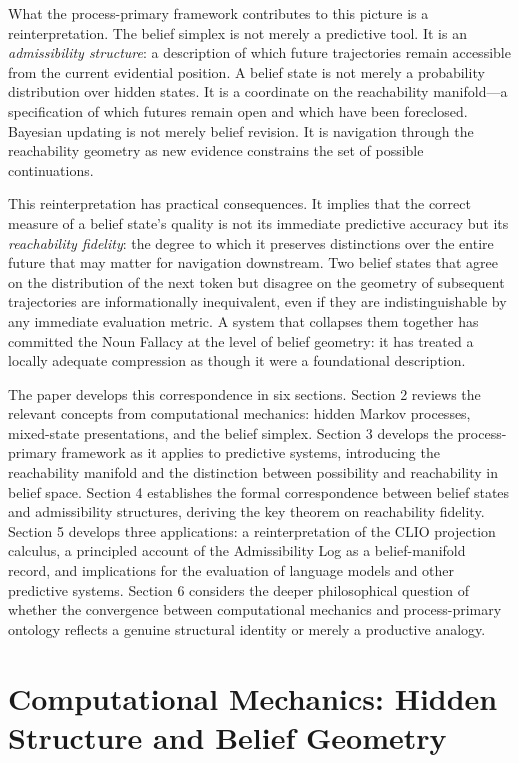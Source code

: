 \documentclass[12pt, a4paper]{article}
\theoremstyle{plain}
\theoremstyle{definition}
\theoremstyle{remark}
\begin{document}
What the process-primary framework contributes to this picture is a
reinterpretation. The belief simplex is not merely a predictive tool. It
is an \emph{admissibility structure}: a description of which future
trajectories remain accessible from the current evidential position. A
belief state is not merely a probability distribution over hidden states.
It is a coordinate on the reachability manifold---a specification of which
futures remain open and which have been foreclosed. Bayesian updating
is not merely belief revision. It is navigation through the reachability
geometry as new evidence constrains the set of possible continuations.

This reinterpretation has practical consequences. It implies that the
correct measure of a belief state's quality is not its immediate predictive
accuracy but its \emph{reachability fidelity}: the degree to which it
preserves distinctions over the entire future that may matter for navigation
downstream. Two belief states that agree on the distribution of the next
token but disagree on the geometry of subsequent trajectories are
informationally inequivalent, even if they are indistinguishable by any
immediate evaluation metric. A system that collapses them together has
committed the Noun Fallacy at the level of belief geometry: it has treated
a locally adequate compression as though it were a foundational description.

The paper develops this correspondence in six sections. Section 2 reviews
the relevant concepts from computational mechanics: hidden Markov processes,
mixed-state presentations, and the belief simplex. Section 3 develops the
process-primary framework as it applies to predictive systems, introducing
the reachability manifold and the distinction between possibility and
reachability in belief space. Section 4 establishes the formal
correspondence between belief states and admissibility structures, deriving
the key theorem on reachability fidelity. Section 5 develops three
applications: a reinterpretation of the CLIO projection calculus, a
principled account of the Admissibility Log as a belief-manifold record,
and implications for the evaluation of language models and other
predictive systems. Section 6 considers the deeper philosophical
question of whether the convergence between computational mechanics
and process-primary ontology reflects a genuine structural identity
or merely a productive analogy.

\section{Computational Mechanics: Hidden Structure and Belief Geometry}
\end{document}
